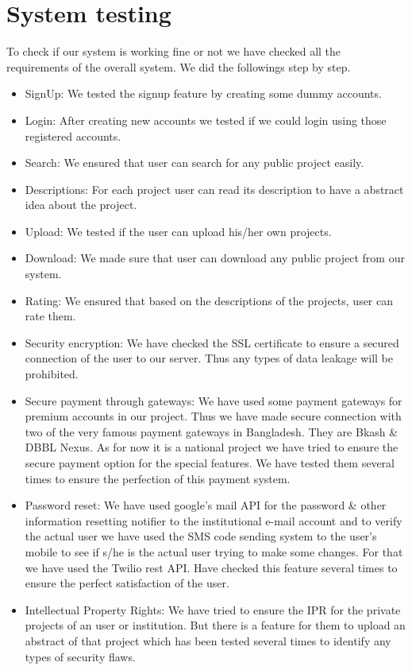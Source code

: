 \documentclass{scrreprt}
\begin{document}
\chapter{System testing}
To check if our system is working fine or not we have checked all the requirements of the overall system.  We did the followings step by step.
\begin{itemize}
\item{SignUp:} We tested the signup feature by creating some dummy accounts.
\item{Login:} After creating  new accounts we tested if we could login using those registered accounts.
\item{Search:} We ensured that user can search for any public project easily.
\item{Descriptions:} For each project user can read its description to have a abstract idea about the project.
\item{Upload:} We tested if the user can upload his/her own projects.
\item{Download:} We made sure that user can download any public project from our system.
\item{Rating:} We ensured that based on the descriptions of the projects, user can rate them.
\item{Security encryption:} We have checked the SSL certificate to ensure a secured connection of the user to our server. Thus any types of data leakage will be prohibited.
\item{Secure payment through gateways:} We have used some payment gateways for premium accounts in our project. Thus we have made secure connection with two of the very famous payment gateways in Bangladesh. They are Bkash \& DBBL Nexus. As for now it is a national project we have tried to ensure the secure payment option for the special features. We have tested them several times to ensure the perfection of this payment system.
\item{Password reset:} We have used google's mail API for the password \& other information resetting notifier to the institutional e-mail account and to verify the actual user we have used the SMS code sending system to the user's mobile to see if s/he is the actual user trying to make some changes. For that we have used the Twilio rest API. Have checked this feature several times to ensure the perfect satisfaction of the user.
\item{Intellectual Property Rights:} We have tried to ensure the IPR for the private projects of an user or institution. But there is a feature for them to upload an abstract of that project which has been tested several times to identify any types of security flaws.

\end{itemize}
\end{document}
